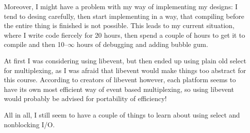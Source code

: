 \documentclass[a4paper,12pt]{article}
\begin{document}
Moreover, I might have a problem with my way of implementing my designs: I tend to desing carefully, then start implementing in a way, that compiling before the entire thing is finished is not possible. This leads to my current situation, where I write code fiercely for 20 hours, then spend a couple of hours to get it to compile and then 10--$\infty$ hours of debugging and adding bubble gum.

At first I was considering using libevent, but then ended up using plain old select for multiplexing, as I was afraid that libevent would make things too abstract for this course. According to creators of libevent however, each platform seems to have its own most efficient way of event based multiplexing, so using libevent would probably be advised for portability of efficiency!

All in all, I still seem to have a couple of things to learn about using select and nonblocking I/O.
\end{document}
